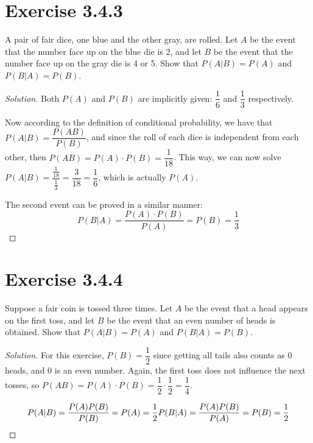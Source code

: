 \documentclass[titlepage, letterpaper, fleqn]{article}
\newcommand{\spacepls}{\vspace{5mm}}
\renewcommand\qedsymbol{\(\blacksquare\)}
\newenvironment{solution}
{\renewcommand\qedsymbol{$\square$}\begin{proof}[Solution]}
{\end{proof}}
\begin{document}
\section{Exercise 3.4.3}

{\large A pair of fair dice, one  blue and the other gray, are rolled.
Let \(A\) be the event that the number face up on the blue die is 2,
and let \(B\) be the event that the number face up on the gray die is 4 or 5.
Show that \(P(A \vert B) = P(A)\) and \(P(B \vert A) = P(B)\)}.

\begin{solution}
Both \(P(A)\) and \(P(B)\) are implicitly given: \(\dfrac{1}{6}\) and \(\dfrac{1}{3}\) respectively.

Now according to the definition of conditional probability, we have that \(P(A \vert B) = \dfrac{P(AB)}{P(B)}\), and since the roll of each dice is independent from each other, then \(P(AB) = P(A) \cdot P(B) = \dfrac{1}{18}\). This way, we can now solve \(P(A \vert B) = \dfrac{\frac{1}{18}}{\frac{1}{3}} = \dfrac{3}{18} = \dfrac{1}{6}\), which is actually \(P(A)\).

The second event can be proved in a similar manner:
\[P(B \vert A) = \dfrac{P(A) \cdot P(B)}{P(A)} = P(B) = \dfrac{1}{3}\]
\end{solution}

\spacepls

\section{Exercise 3.4.4}

{\large Suppose a fair coin is tossed three times.
Let \(A\) be the event that a head appears on the first toss,
and let \(B\) be the event that an even number of heads is obtained.
Show that \(P(A \vert B) = P(A)\) and \(P(B \vert A) = P(B)\)}.

\begin{solution}
For this exercise, \(P(B) = \dfrac{1}{2}\) since getting all tails also counts as 0 heads, and 0 is an even number.
Again, the first toss does not influence the next tosses, so \(P(AB) = P(A) \cdot P(B) = \dfrac{1}{2} \cdot \dfrac{1}{2} = \dfrac{1}{4}\).

\[P(A \vert B) = \dfrac{P(A)P(B)}{P(B)} = P(A) = \dfrac{1}{2}\\
P(B \vert A) = \dfrac{P(A)P(B)}{P(A)} = P(B) = \dfrac{1}{2} \qedhere\]
\end{solution}

\spacepls
\end{document}

